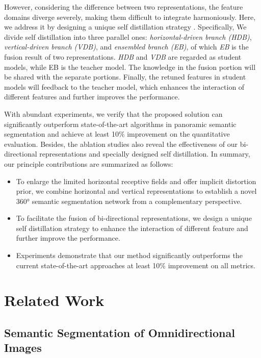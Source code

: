 \documentclass[runningheads]{llncs}
\begin{document}
	
	However, considering the difference between two representations, the feature domains diverge severely, making them difficult to integrate harmoniously.
	Here, we address it by designing a unique self distillation strategy \cite{zhang2019your}.
	Specifically, We divide self distillation into three parallel ones: \emph{horizontal-driven branch (HDB)}, \emph{vertical-driven branch (VDB)}, and \emph{ensembled branch (EB)}, of which \emph{EB} is the fusion result of two representations.
\emph{HDB} and \emph{VDB} are regarded as student models, while EB is the teacher model. The knowledge in the fusion portion will be shared with the separate portions.
	Finally, the retuned features in student models will feedback to the teacher model, which enhances the interaction of different features and further improves the performance.


	


	
	With abundant experiments, we verify that the proposed solution can significantly outperform state-of-the-art algorithms in panoramic semantic segmentation and achieve at least 10\% improvement on the quantitative evaluation.
	Besides, the ablation studies also reveal the effectiveness of our bi-directional representations and specially designed self distillation.
In summary, our principle contributions are summarized as follows:
	\begin{itemize}
		\item To enlarge the limited horizontal receptive fields and offer implicit distortion prior, we combine horizontal and vertical representations to establish a novel 360° semantic segmentation network from a complementary perspective.
\item To facilitate the fusion of bi-directional representations, we design a unique self distillation strategy to enhance the interaction of different feature and further improve the performance.
\item Experiments demonstrate that our method significantly outperforms the current state-of-the-art approaches at least 10\% improvement on all metrics.
\end{itemize}
	
	
	
	\section{Related Work}
	
	
	
	\subsection{Semantic Segmentation of Omnidirectional Images}
	
\end{document}
